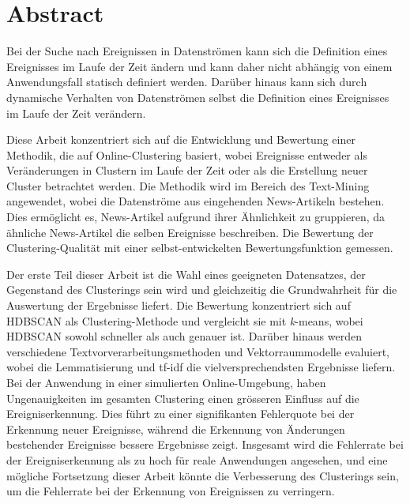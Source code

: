 
\section*{Abstract}

Bei der Suche nach Ereignissen in Datenströmen kann sich die Definition eines Ereignisses im Laufe der Zeit ändern und kann daher nicht abhängig von einem Anwendungsfall statisch definiert werden. Darüber hinaus kann sich durch dynamische Verhalten von Datenströmen selbst die Definition eines Ereignisses im Laufe der Zeit verändern.

Diese Arbeit konzentriert sich auf die Entwicklung und Bewertung einer Methodik, die auf Online-Clustering basiert, wobei Ereignisse entweder als Veränderungen in Clustern im Laufe der Zeit oder als die Erstellung neuer Cluster betrachtet werden. Die Methodik wird im Bereich des Text-Mining angewendet, wobei die Datenströme aus eingehenden News-Artikeln bestehen. Dies ermöglicht es, News-Artikel aufgrund ihrer Ähnlichkeit zu gruppieren, da ähnliche News-Artikel die selben Ereignisse beschreiben. Die Bewertung der Clustering-Qualität mit einer selbst-entwickelten Bewertungsfunktion gemessen.

Der erste Teil dieser Arbeit ist die Wahl eines geeigneten Datensatzes, der Gegenstand des Clusterings sein wird und gleichzeitig die Grundwahrheit für die Auswertung der Ergebnisse liefert. Die Bewertung konzentriert sich auf HDBSCAN als Clustering-Methode und vergleicht sie mit \textit{k}-means, wobei HDBSCAN sowohl schneller als auch genauer ist. Darüber hinaus werden verschiedene Textvorverarbeitungsmethoden und Vektorraummodelle evaluiert, wobei die Lemmatisierung und tf-idf die vielversprechendsten Ergebnisse liefern. Bei der Anwendung in einer simulierten Online-Umgebung, haben Ungenauigkeiten im gesamten Clustering einen grösseren Einfluss auf die Ereigniserkennung. Dies führt zu einer signifikanten Fehlerquote bei der Erkennung neuer Ereignisse, während die Erkennung von Änderungen bestehender Ereignisse bessere Ergebnisse zeigt. Insgesamt wird die Fehlerrate bei der Ereigniserkennung als zu hoch für reale Anwendungen angesehen, und eine mögliche Fortsetzung dieser Arbeit könnte die Verbesserung des Clusterings sein, um die Fehlerrate bei der Erkennung von Ereignissen zu verringern.

